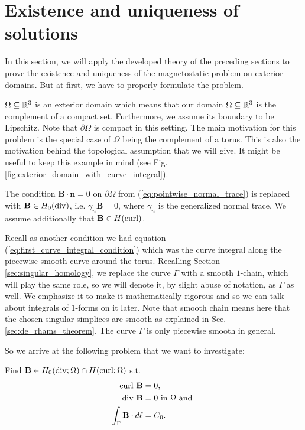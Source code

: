 \documentclass[../master_thesis.tex]{subfiles}
\begin{document}
\section{Existence and uniqueness of solutions}\label{sec:existence_and_uniqueness}

In this section, we will apply the developed theory of the preceding sections
to prove the existence and uniqueness of the magnetostatic problem 
on exterior domains. But at first, we have to properly formulate the problem.

$\Omega \subseteq \mathbb{R}^3$ is an exterior domain which means 
that our domain $\Omega \subseteq \mathbb{R}^3$
is the complement of a compact set. Furthermore, we assume its boundary to be 
Lipschitz. Note that $\partial \Omega$ is compact in this setting.
The main motivation for this problem is 
the special case of $\Omega$ being the complement of a torus. 
This is also the motivation behind the
topological assumption that we will give. It might be useful to keep this
example in mind (see Fig.\,\ref{fig:exterior_domain_with_curve_integral}).

The condition $\mathbf{B}\cdot \mathbf{n} = 0$ on $\partial\Omega$ from 
(\ref{eq:pointwise_normal_trace}) is replaced
with $\mathbf{B} \in H_0(\operatorname{div})$, i.e. $\gamma_n\mathbf{B} = 0$, where 
$\gamma_n$ is the generalized normal trace. We assume additionally that 
$\mathbf{B} \in H(\operatorname{curl})$. 

Recall as another condition we had equation (\ref{eq:first_curve_integral_condition}) 
which was the curve integral along the piecewise smooth curve around the torus.
Recalling Section\,\ref{sec:singular_homology}, we replace the curve $\Gamma$
with a smooth $1$-chain, which will play the same role, so we will 
denote it, by slight abuse of notation, as $\Gamma$ as well. We emphasize 
it to make it mathematically rigorous and so we can talk about integrals 
of $1$-forms on it later. Note that smooth chain means here that the chosen 
singular simplices are smooth as explained in Sec.\,\ref{sec:de_rhams_theorem}. 
The curve $\Gamma$ is only piecewise smooth in 
general.

So we arrive at the following problem that we want to investigate:
\begin{problem}\label{prob:magnetostatic_problem}
    Find $\mathbf{B} \in H_0(\operatorname{div};\Omega) \cap H(\operatorname{curl};\Omega)$ s.t.
    \begin{align}
        \operatorname{curl} \, \mathbf{B} &= 0, \\ 
        \operatorname{div} \, \mathbf{B}  &= 0 \text{ in } \Omega \text{ and }\\
        \int_\Gamma \mathbf{B} \cdot d\ell &= C_0.
    \end{align}
\end{problem}
\end{document}
